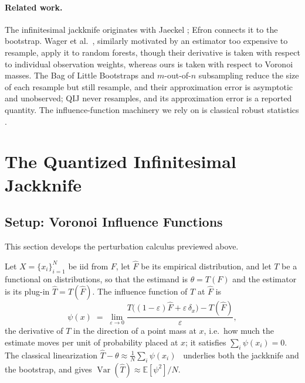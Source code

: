 \documentclass[runningheads]{llncs}
\begin{document}
\paragraph{Related work.} The infinitesimal jackknife originates with Jaeckel \cite{jaeckel1972}; Efron \cite{efron1982} connects it to the bootstrap. Wager et al.\ \cite{wager2014}, similarly motivated by an estimator too expensive to resample, apply it to random forests, though their derivative is taken with respect to individual observation weights, whereas ours is taken with respect to Voronoi masses. The Bag of Little Bootstraps \cite{kleiner2014} and $m$-out-of-$n$ subsampling \cite{bickel1997} reduce the size of each resample but still resample, and their approximation error is asymptotic and unobserved; QIJ never resamples, and its approximation error is a reported quantity. The influence-function machinery we rely on is classical robust statistics \cite{hampel1974,stefanski2002}.


\section{The Quantized Infinitesimal Jackknife}\label{sec:method}

\subsection{Setup: Voronoi Influence Functions}\label{sec:setup}

This section develops the perturbation calculus previewed above. 

Let $X=\{x_i\}_{i=1}^{N}$ be iid from $F$, let $\hat{F}$ be its empirical
distribution, and let $T$ be a functional on distributions, so that the
estimand is $\theta = T(F)$ and the estimator is its plug-in
$\hat{T} = T(\hat{F})$. The influence function of $T$ at $\hat{F}$ is
%
\begin{equation}\label{eq:if}
  \psi(x) \;=\; \lim_{\varepsilon \to 0}
  \frac{T\!\big((1-\varepsilon)\hat{F} + \varepsilon\,\delta_x\big) - T(\hat{F})}
       {\varepsilon},
\end{equation}
%
the derivative of $T$ in the direction of a point mass at $x$, i.e.\ how much
the estimate moves per unit of probability placed at $x$; it satisfies
$\sum_i \psi(x_i) = 0$. The classical linearization
$\hat{T} - \theta \approx \tfrac{1}{N}\sum_i \psi(x_i)$~\cite{vonmises1947,hampel1974}
underlies both the jackknife and the bootstrap, and gives
$\operatorname{Var}(\hat{T}) \approx \mathbb{E}[\psi^2]/N$.
\end{document}
